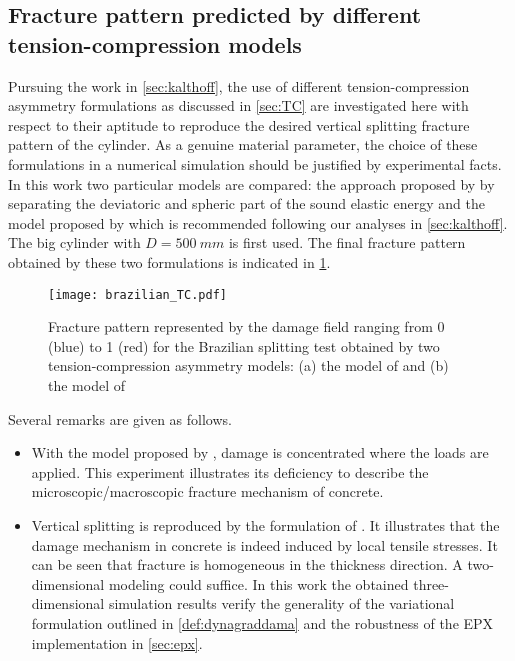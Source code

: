 \subsection{Fracture pattern predicted by different tension-compression models}
Pursuing the work in \cref{sec:kalthoff}, the use of different tension-compression asymmetry formulations as discussed in \cref{sec:TC} are investigated here with respect to their aptitude to reproduce the desired vertical splitting fracture pattern of the cylinder. As a genuine material parameter, the choice of these formulations in a numerical simulation should be justified by experimental facts. In this work two particular models are compared: the approach proposed by \cite{AmorMarigoMaurini:2009} by separating the deviatoric and spheric part of the sound elastic energy and the model proposed by \cite{FreddiRoyer-Carfagni:2010} which is recommended following our analyses in \cref{sec:kalthoff}. The big cylinder with $D=\SI{500}{mm}$ is first used. The final fracture pattern obtained by these two formulations is indicated in \cref{fig:brazilian_tc}.
\begin{figure}[htbp]
\centering
\texttt{[image: brazilian\_TC.pdf]}
\caption{Fracture pattern represented by the damage field ranging from 0 (blue) to 1 (red) for the Brazilian splitting test obtained by two tension-compression asymmetry models: (a) the model of \cite{AmorMarigoMaurini:2009} and (b) the model of \cite{FreddiRoyer-Carfagni:2010}} \label{fig:brazilian_tc}
\end{figure}
Several remarks are given as follows.
\begin{itemize}
\item With the model proposed by \cite{AmorMarigoMaurini:2009}, damage is concentrated where the loads are applied. This experiment illustrates its deficiency to describe the microscopic/macroscopic fracture mechanism of concrete.

\item Vertical splitting is reproduced by the formulation of \cite{FreddiRoyer-Carfagni:2010}. It illustrates that the damage mechanism in concrete is indeed induced by local tensile stresses. It can be seen that fracture is homogeneous in the thickness direction. A two-dimensional modeling could suffice. In this work the obtained three-dimensional simulation results verify the generality of the variational formulation outlined in \cref{def:dynagraddama} and the robustness of the EPX implementation in \cref{sec:epx}.
\end{itemize}

